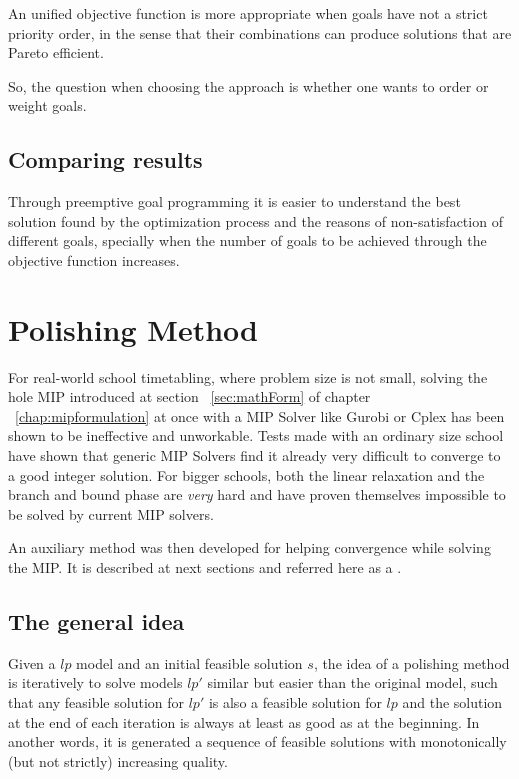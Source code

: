 An unified objective function is more appropriate when goals have not a strict priority order, in the sense that their combinations can produce solutions that are Pareto efficient.

So, the question when choosing the approach is whether one wants to order or weight goals.


\subsection{Comparing results}

Through preemptive goal programming it is easier to understand the best solution found by the optimization process and the reasons of non-satisfaction of different goals, specially when the number of goals to be achieved through the objective function increases.





\section{Polishing Method}

For real-world school timetabling, where problem size is not small, solving the hole MIP introduced at section ~\ref{sec:mathForm} of chapter ~\ref{chap:mipformulation} at once with a MIP Solver like Gurobi or Cplex has been shown to be ineffective and unworkable. Tests made with an ordinary size school  have shown that generic MIP Solvers find it already very difficult to converge to a good integer solution. For bigger schools, both the linear relaxation and the branch and bound phase are \textit{very} hard and have proven themselves impossible to be solved by current MIP solvers.

An auxiliary method was then developed for helping convergence while solving the MIP. It is described at next sections and referred here as a .


\subsection{The general idea}

Given a $lp$ model and an initial feasible solution $s$, the idea of a polishing method is iteratively to solve models $lp'$ similar but easier than the original model, such that any feasible solution for $lp'$ is also a feasible solution for $lp$ and the solution at the end of each iteration is always at least as good as at the beginning. In another words, it is generated a sequence of feasible solutions with monotonically (but not strictly) increasing quality.

